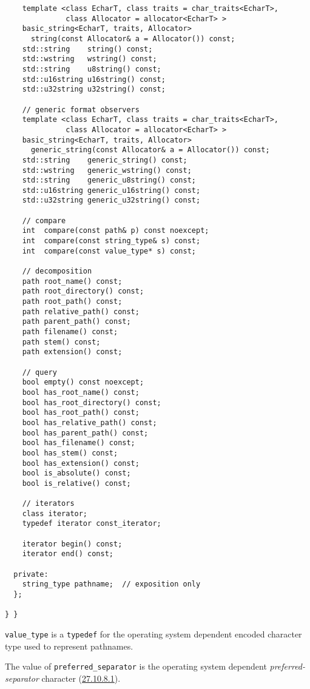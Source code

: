 \begin{verbatim}
    template <class EcharT, class traits = char_traits<EcharT>,
              class Allocator = allocator<EcharT> >
    basic_string<EcharT, traits, Allocator>
      string(const Allocator& a = Allocator()) const;
    std::string    string() const;
    std::wstring   wstring() const;
    std::string    u8string() const;
    std::u16string u16string() const;
    std::u32string u32string() const;

    // generic format observers
    template <class EcharT, class traits = char_traits<EcharT>,
              class Allocator = allocator<EcharT> >
    basic_string<EcharT, traits, Allocator>
      generic_string(const Allocator& a = Allocator()) const;
    std::string    generic_string() const;
    std::wstring   generic_wstring() const;
    std::string    generic_u8string() const;
    std::u16string generic_u16string() const;
    std::u32string generic_u32string() const;

    // compare
    int  compare(const path& p) const noexcept;
    int  compare(const string_type& s) const;
    int  compare(const value_type* s) const;

    // decomposition
    path root_name() const;
    path root_directory() const;
    path root_path() const;
    path relative_path() const;
    path parent_path() const;
    path filename() const;
    path stem() const;
    path extension() const;

    // query
    bool empty() const noexcept;
    bool has_root_name() const;
    bool has_root_directory() const;
    bool has_root_path() const;
    bool has_relative_path() const;
    bool has_parent_path() const;
    bool has_filename() const;
    bool has_stem() const;
    bool has_extension() const;
    bool is_absolute() const;
    bool is_relative() const;

    // iterators
    class iterator;
    typedef iterator const_iterator;

    iterator begin() const;
    iterator end() const;

  private:
    string_type pathname;  // exposition only
  };

} }
\end{verbatim}

\texttt{value\_type} is a \texttt{typedef} for the operating system
dependent encoded character type used to represent pathnames.

The value of \texttt{preferred\_separator} is the operating system
dependent \emph{preferred-separator} character
(\hyperref[path.generic]{27.10.8.1}).

